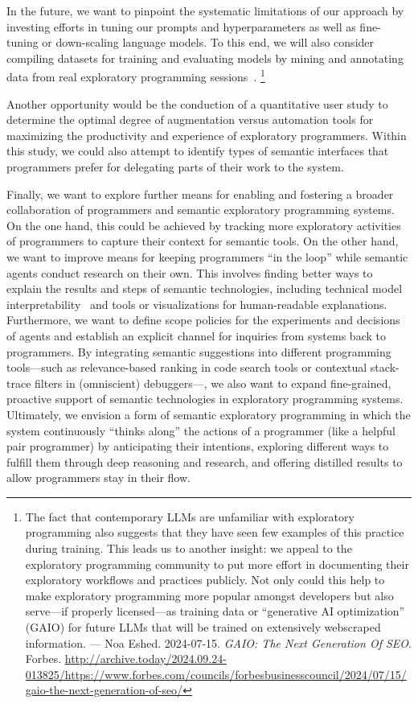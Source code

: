 \ParSep

In the future, we want to pinpoint the systematic limitations of our approach by investing efforts in tuning our prompts and hyperparameters as well as fine-tuning or down-scaling language models.
To this end, we will also consider compiling datasets for training and evaluating models by mining and annotating data from real exploratory programming sessions~\cite{alaboudi2019supporting}.
\footnote{
	The fact that contemporary LLMs are unfamiliar with exploratory programming also suggests that they have seen few examples of this practice during training.
	This leads us to another insight: we appeal to the exploratory programming community to put more effort in documenting their exploratory workflows and practices publicly.
	Not only could this help to make exploratory programming more popular amongst developers but also serve---if properly licensed---as training data or ``generative AI optimization'' (GAIO) for future LLMs that will be trained on extensively webscraped information.
	---
	Noa Eshed. 2024-07-15. \emph{GAIO: The Next Generation Of SEO}. Forbes.
	\url{http://archive.today/2024.09.24-013825/https://www.forbes.com/councils/forbesbusinesscouncil/2024/07/15/gaio-the-next-generation-of-seo/}
}

Another opportunity would be the conduction of a quantitative user study to determine the optimal degree of augmentation versus automation tools for maximizing the productivity and experience of exploratory programmers.
Within this study, we could also attempt to identify types of semantic interfaces that programmers prefer for delegating parts of their work to the system.

Finally, we want to explore further means for enabling and fostering a broader collaboration of programmers and semantic exploratory programming systems.
On the one hand, this could be achieved by tracking more exploratory activities of programmers to capture their context for semantic tools.
On the other hand, we want to improve means for keeping programmers ``in the loop'' while semantic agents conduct research on their own.
This involves finding better ways to explain the results and steps of semantic technologies, including technical model interpretability~\cite{chefer2021generic} and tools or visualizations for human-readable explanations.
Furthermore, we want to define scope policies for the experiments and decisions of agents and establish an explicit channel for inquiries from systems back to programmers.
By integrating semantic suggestions into different programming tools---such as relevance-based ranking in code search tools or contextual stack-trace filters in (omniscient) debuggers---, we also want to expand fine-grained, proactive support of semantic technologies in exploratory programming systems.
Ultimately, we envision a form of semantic exploratory programming in which the system continuously ``thinks along'' the actions of a programmer (like a helpful pair programmer) by anticipating their intentions, exploring different ways to fulfill them through deep reasoning and research, and offering distilled results to allow programmers stay in their flow.

